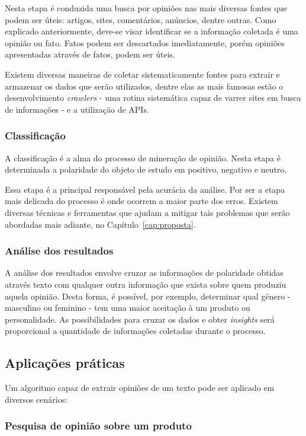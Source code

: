 Nesta etapa é conduzida uma busca por opiniões nas mais diversas fontes que podem ser úteis: artigos, sites, comentários, anúncios, dentre outras. Como explicado anteriormente, deve-se visar identificar se a informação coletada é uma opinião ou fato. Fatos podem ser descartados imediatamente, porém opiniões apresentadas através de fatos, podem ser úteis.

Existem diversas maneiras de coletar sistematicamente fontes para extrair e armazenar os dados que serão utilizados, dentre elas as mais famosas estão o desenvolvimento \textit{crawlers} - uma rotina sistemática capaz de varrer sites em busca de informações - e a utilização de APIs.

\subsubsection{Classificação}

A classificação é a alma do processo de mineração de opinião. Nesta etapa é determinada a polaridade do objeto de estudo em positivo, negativo e neutro.

Essa etapa é a principal responsável pela acurácia da análise. Por ser a etapa mais delicada do processo é onde ocorrem a maior parte dos erros. Existem diversas técnicas e ferramentas que ajudam a mitigar tais problemas que serão abordadas mais adiante, no Capítulo~\ref{cap:proposta}.

\subsubsection{Análise dos resultados}

A análise dos resultados envolve cruzar as informações de polaridade obtidas através texto com qualquer outra informação que exista sobre quem produziu aquela opinião. Desta forma, é possível, por exemplo, determinar qual gênero - masculino ou feminino - tem uma maior aceitação à um produto ou personalidade. As possibilidades para cruzar os dados e obter \textit{insights} será proporcional a quantidade de informações coletadas durante o processo.

\subsection{Aplicações práticas}

Um algoritmo capaz de extrair opiniões de um texto pode ser aplicado em diversos cenários:

\subsubsection{Pesquisa de opinião sobre um produto}

